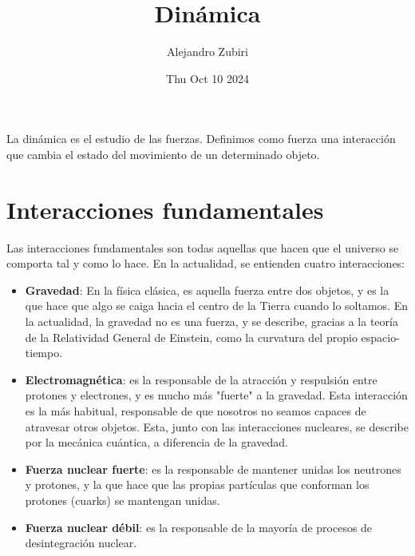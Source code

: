 \documentclass{article}
\author{Alejandro Zubiri}
\date{Thu Oct 10 2024}
\title{Dinámica}
\begin{document}
\maketitle
\tableofcontents
\pagebreak
La dinámica es el estudio de las fuerzas. Definimos como fuerza una interacción que cambia el estado del movimiento de
un determinado objeto.
\section{Interacciones fundamentales}
Las interacciones fundamentales son todas aquellas que hacen que el universo se comporta tal y como lo hace.
En la actualidad, se entienden cuatro interacciones:
\begin{itemize}
    \item \textbf{Gravedad}: En la física clásica, es aquella fuerza entre dos objetos, y es la que hace que algo se caiga
    hacia el centro de la Tierra cuando lo soltamos. En la actualidad, la gravedad no es una fuerza, y se describe, gracias a
    la teoría de la Relatividad General de Einstein, como la curvatura del propio espacio-tiempo.
    \item \textbf{Electromagnética}: es la responsable de la atracción y respulsión entre protones y electrones, y
    es mucho más "fuerte" a la gravedad. Esta interacción es la más habitual, responsable de que nosotros no seamos
    capaces de atravesar otros objetos. Esta, junto con las interacciones nucleares, se describe por la mecánica
    cuántica, a diferencia de la gravedad.
    \item \textbf{Fuerza nuclear fuerte}: es la responsable de mantener unidas los neutrones y protones, y la que hace
    que las propias partículas que conforman los protones (cuarks) se mantengan unidas.
    \item \textbf{Fuerza nuclear débil}: es la responsable de la mayoría de procesos de desintegración nuclear.
\end{itemize}
\end{document}

